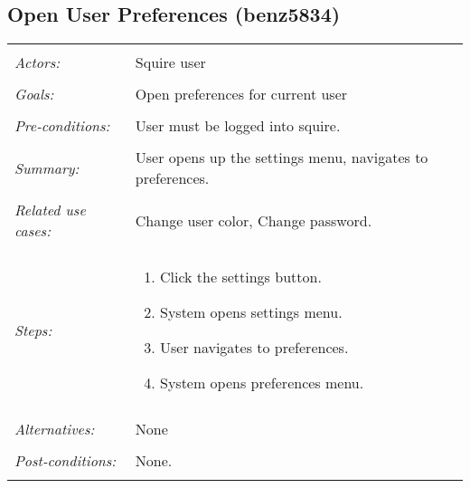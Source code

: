 \subsection{Open User Preferences (benz5834)}
\begin{tabular}{ p{2cm} p{12cm} }
 \hline
 \\
 \textit{Actors:} & Squire user \\ 
 \\
 \textit{Goals:} & Open preferences for current user \\
 \\
 \textit{Pre-conditions:} & User must be logged into squire. \\
 \\
 \textit{Summary:} & User opens up the settings menu, navigates to preferences.  \\ 
 \\
 \textit{Related use cases:} & Change user color, Change password. \\ 
 \\
 \textit{Steps:} & \begin{enumerate}
  \item Click the settings button.
  \item System opens settings menu.
  \item User navigates to preferences. 
  \item System opens preferences menu.
 \end{enumerate} \\
 \\
 \textit{Alternatives:} & None \\
 \\
 \textit{Post-conditions:} & None. \\
 \\
\hline
\end{tabular}

